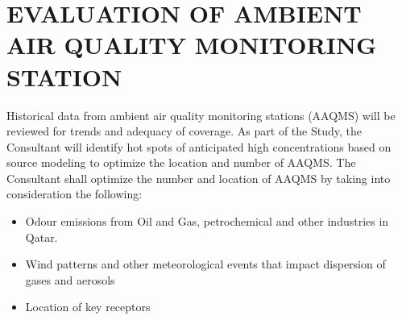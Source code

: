 \section{EVALUATION OF AMBIENT AIR QUALITY MONITORING STATION}
Historical data from ambient air quality monitoring stations (AAQMS) will be reviewed for trends and adequacy of coverage. As part of the Study, the Consultant will identify hot spots of anticipated high concentrations based on source modeling to optimize the location and number of AAQMS. The Consultant shall optimize the number and location of AAQMS by taking into consideration the following:

\begin{itemize}
\item Odour emissions from Oil and Gas, petrochemical and other industries in Qatar. 
\item Wind patterns and other meteorological events that impact dispersion of gases and aerosols
\item Location of key receptors
\end{itemize}

